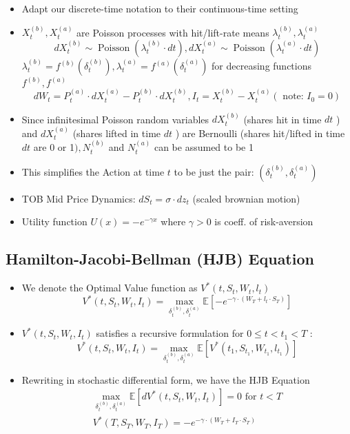\documentclass[10pt]{article}
\begin{document}
\begin{itemize} 
    \item Adapt our discrete-time notation to their continuous-time setting
    \item $X_{t}^{(b)}, X_{t}^{(a)}$ are Poisson processes with hit/lift-rate means $\lambda_{t}^{(b)}, \lambda_{t}^{(a)}$
    $$
    d X_{t}^{(b)} \sim \operatorname{Poisson}\left(\lambda_{t}^{(b)} \cdot d t\right), d X_{t}^{(a)} \sim \operatorname{Poisson}\left(\lambda_{t}^{(a)} \cdot d t\right)
    $$
    $\lambda_{t}^{(b)}=f^{(b)}\left(\delta_{t}^{(b)}\right), \lambda_{t}^{(a)}=f^{(a)}\left(\delta_{t}^{(a)}\right)$ for decreasing functions $f^{(b)}, f^{(a)}$
    $$
    d W_{t}=P_{t}^{(a)} \cdot d X_{t}^{(a)}-P_{t}^{(b)} \cdot d X_{t}^{(b)}, I_{t}=X_{t}^{(b)}-X_{t}^{(a)}\left(\text { note: } I_{0}=0\right)
    $$
    \item Since infinitesimal Poisson random variables $d X_{t}^{(b)}$ (shares hit in time $d t$ ) and $d X_{t}^{(a)}$ (shares lifted in time $d t$ ) are Bernoulli (shares hit/lifted in time $d t$ are 0 or 1$), N_{t}^{(b)}$ and $N_{t}^{(a)}$ can be assumed to be 1
    \item This simplifies the Action at time $t$ to be just the pair: $\left(\delta_{t}^{(b)}, \delta_{t}^{(a)}\right)$
    \item TOB Mid Price Dynamics: $d S_{t}=\sigma \cdot d z_{t}$ (scaled brownian motion)
    \item Utility function $U(x)=-e^{-\gamma x}$ where $\gamma>0$ is coeff. of risk-aversion
\end{itemize}


\subsection{Hamilton-Jacobi-Bellman (HJB) Equation}

\begin{itemize} 
    \item We denote the Optimal Value function as $V^{*}\left(t, S_{t}, W_{t}, l_{t}\right)$
    $$
    V^{*}\left(t, S_{t}, W_{t}, I_{t}\right)=\max _{\delta_{t}^{(b)}, \delta_{t}^{(a)}} \mathbb{E}\left[-e^{-\gamma \cdot\left(W_{T}+l_{t} \cdot S_{T}\right)}\right]
    $$
    \item $V^{*}\left(t, S_{t}, W_{t}, I_{t}\right)$ satisfies a recursive formulation for $0 \leq t<t_{1}<T$ :
    $$
    V^{*}\left(t, S_{t}, W_{t}, I_{t}\right)=\max _{\delta_{t}^{(b)}, \delta_{t}^{(a)}} \mathbb{E}\left[V^{*}\left(t_{1}, S_{t_{1}}, W_{t_{1}}, l_{t_{1}}\right)\right]
    $$
    \item Rewriting in stochastic differential form, we have the HJB Equation
    $$
    \begin{array}{c}
    \max _{\delta_{t}^{(b)}, \delta_{t}^{(a)}} \mathbb{E}\left[d V^{*}\left(t, S_{t}, W_{t}, I_{t}\right)\right]=0 \text { for } t<T \\
    V^{*}\left(T, S_{T}, W_{T}, I_{T}\right)=-e^{-\gamma \cdot\left(W_{T}+I_{T} \cdot S_{T}\right)}
    \end{array}
    $$
\end{itemize}
\end{document}
